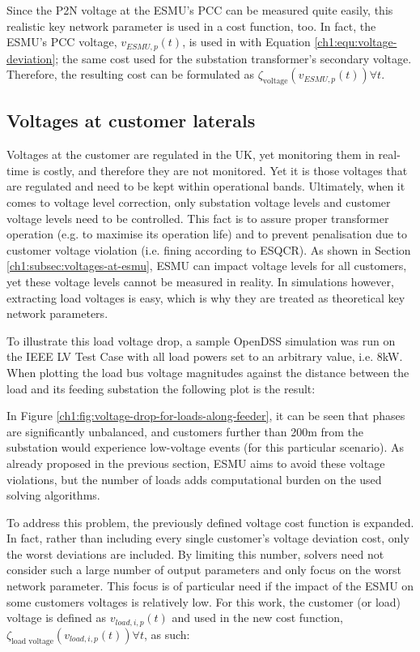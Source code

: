 Since the P2N voltage at the ESMU's PCC can be measured quite easily, this realistic key network parameter is used in a cost function, too.
In fact, the ESMU's PCC voltage, $v_{ESMU,p}(t)$, is used in with Equation \ref{ch1:equ:voltage-deviation}; the same cost used for the substation transformer's secondary voltage.
Therefore, the resulting cost can be formulated as $\zeta_\text{voltage}(v_{ESMU,p}(t)) \forall t$.

\subsection{Voltages at customer laterals}
\label{ch1:subsec:voltages-at-customers}

Voltages at the customer are regulated in the UK, yet monitoring them in real-time is costly, and therefore they are not monitored.
Yet it is those voltages that are regulated and need to be kept within operational bands.
Ultimately, when it comes to voltage level correction, only substation voltage levels and customer voltage levels need to be controlled.
This fact is to assure proper transformer operation (e.g. to maximise its operation life) and to prevent penalisation due to customer voltage violation (i.e. fining according to ESQCR).
As shown in Section \ref{ch1:subsec:voltages-at-esmu}, ESMU can impact voltage levels for all customers, yet these voltage levels cannot be measured in reality.
In simulations however, extracting load voltages is easy, which is why they are treated as theoretical key network parameters.

To illustrate this load voltage drop, a sample OpenDSS simulation was run on the IEEE LV Test Case with all load powers set to an arbitrary value, i.e. 8kW.
When plotting the load bus voltage magnitudes against the distance between the load and its feeding substation the following plot is the result:



In Figure \ref{ch1:fig:voltage-drop-for-loads-along-feeder}, it can be seen that phases are significantly unbalanced, and customers further than 200m from the substation would experience low-voltage events (for this particular scenario).
As already proposed in the previous section, ESMU aims to avoid these voltage violations, but the number of loads adds computational burden on the used solving algorithms.

To address this problem, the previously defined voltage cost function is expanded.
In fact, rather than including every single customer's voltage deviation cost, only the worst deviations are included.
By limiting this number, solvers need not consider such a large number of output parameters and only focus on the worst network parameter.
This focus is of particular need if the impact of the ESMU on some customers voltages is relatively low.
For this work, the customer (or load) voltage is defined as $v_{load,i,p}(t)$ and used in the new cost function, $\zeta_\text{load voltage}(v_{load,i,p}(t)) \forall t$, as such:

